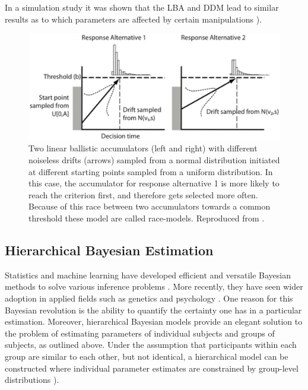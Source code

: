 \documentclass[letterpaper,10pt,english]{sphinxmanual}
\begin{document}
In a simulation study it was shown that the LBA and DDM lead to
similar results as to which parameters are affected by certain
manipulations \citep{DonkinBrownHeathcoteEtAl11}).
\begin{figure}[htbp]
\centering
\capstart

\includegraphics[scale=.4]{lba.png}
\caption{Two linear ballistic accumulators (left and right) with different
noiseless drifts (arrows) sampled from a normal distribution
initiated at different starting points sampled from a uniform
distribution. In this case, the accumulator for response
alternative 1 is more likely to reach the criterion first, and
therefore gets selected more often. Because of this race between
two accumulators towards a common threshold these model are called
race-models. Reproduced from \citep{DonkinBrownHeathcoteEtAl11}.}\end{figure}


\subsection{Hierarchical Bayesian Estimation}
\label{methods:hierarchical-bayesian-estimation}
Statistics and machine learning have developed efficient and versatile
Bayesian methods to solve various inference problems
\citep{Poirier06}. More recently, they have seen wider adoption in
applied fields such as genetics \citep{StephensBalding09} and
psychology \citep{ClemensDeSelenEtAl11}. One reason for this
Bayesian revolution is the ability to quantify the certainty one has
in a particular estimation. Moreover, hierarchical Bayesian models
provide an elegant solution to the problem of estimating parameters of
individual subjects and groups of subjects, as outlined above. Under the assumption that
participants within each group are similar to each other, but not
identical, a hierarchical model can be constructed where individual
parameter estimates are constrained by group-level distributions
\citep{NilssonRieskampWagenmakers11,ShiffrinLeeKim08}).
\end{document}
